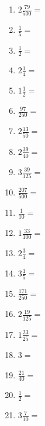 \documentclass[12pt]{article}
\begin{document}
\begin{enumerate}
\item \large $ 2 \frac{79}{500} = $ \vspace{1.5cm}
\item \large $ \frac{1}{5} = $ \vspace{1.5cm}
\item \large $ \frac{1}{2} = $ \vspace{1.5cm}
\item \large $ 2 \frac{1}{4} = $ \vspace{1.5cm}
\item \large $ 1 \frac{1}{2} = $ \vspace{1.5cm}
\newpage
\item \large $ \frac{97}{250} = $ \vspace{1.5cm}
\item \large $ 2 \frac{13}{50} = $ \vspace{1.5cm}
\item \large $ 2 \frac{39}{40} = $ \vspace{1.5cm}
\item \large $ 3 \frac{39}{125} = $ \vspace{1.5cm}
\item \large $ \frac{207}{500} = $ \vspace{1.5cm}
\item \large $ \frac{1}{10} = $ \vspace{1.5cm}
\item \large $ 1 \frac{33}{100} = $ \vspace{1.5cm}
\item \large $ 2 \frac{3}{4} = $ \vspace{1.5cm}
\item \large $ 3 \frac{1}{5} = $ \vspace{1.5cm}
\item \large $ \frac{171}{250} = $ \vspace{1.5cm}
\newpage
\item \large $ 2 \frac{19}{125} = $ \vspace{1.5cm}
\item \large $ 1 \frac{23}{25} = $ \vspace{1.5cm}
\item \large $ 3 = $ \vspace{1.5cm}
\item \large $ \frac{21}{40} = $ \vspace{1.5cm}
\item \large $ \frac{1}{2} = $ \vspace{1.5cm}
\item \large $ 3 \frac{7}{10} = $ \vspace{1.5cm}

\end{enumerate}
\end{document}
